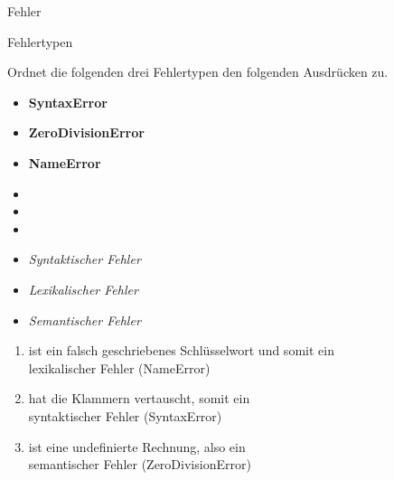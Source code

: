 \begin{task}[points=auto]{Fehler}
    \begin{subtask*}[points=0]{Fehlertypen }

        Ordnet die folgenden drei Fehlertypen den folgenden Ausdrücken zu.
        \begin{multicols}{3}
            \begin{itemize}
                \item[] \textbf{SyntaxError}
                \item[] \textbf{ZeroDivisionError}
                \item[] \textbf{NameError}
            \end{itemize}
            \begin{itemize}
                \item[] 
                \item[] 
                \item[] 
            \end{itemize}
            \begin{itemize}
                \item[] \textit{Syntaktischer Fehler}
                \item[] \textit{Lexikalischer Fehler}
                \item[] \textit{Semantischer Fehler}
            \end{itemize}
        \end{multicols}

        \begin{solution}
            \begin{enumerate}
                \item {} ist ein falsch geschriebenes Schlüsselwort und somit ein \\
                    lexikalischer Fehler (NameError)
                \item {} hat die Klammern vertauscht, somit ein \\
                    syntaktischer Fehler (SyntaxError)
                \item {} ist eine undefinierte Rechnung, also ein
                    \\ semantischer Fehler (ZeroDivisionError)
            \end{enumerate}


\end{solution}
\end{subtask*}
\end{task}

